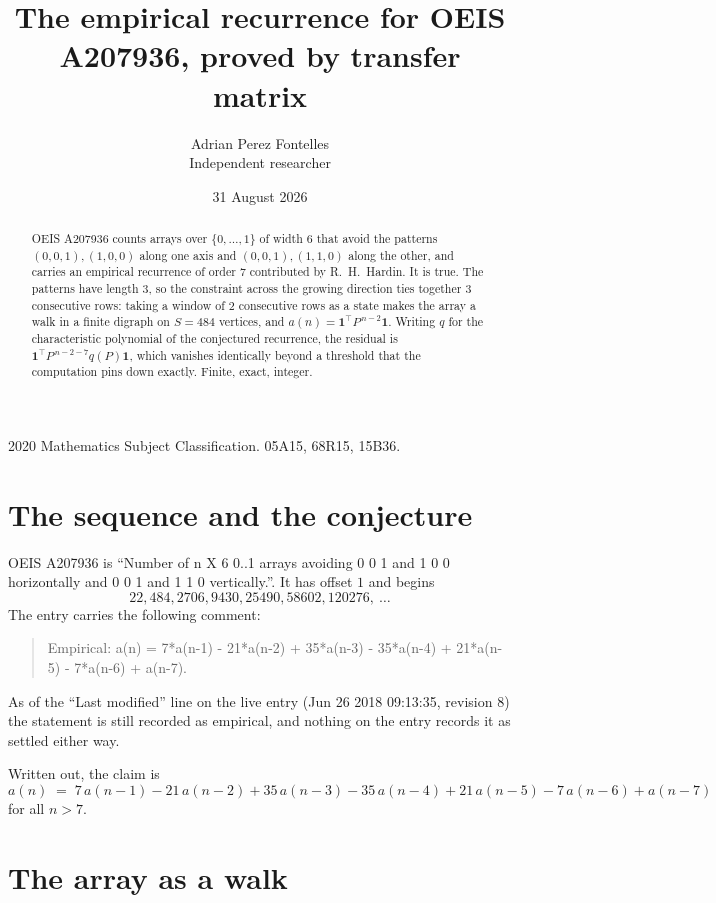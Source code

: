 \documentclass[11pt,a4paper]{article}
\title{The empirical recurrence for OEIS A207936, proved by transfer matrix}
\author{Adrian Perez Fontelles\\ \small Independent researcher}
\date{31 August 2026}
\theoremstyle{plain}
\theoremstyle{definition}
\begin{document}
\maketitle

\begin{abstract}
OEIS A207936 counts arrays over $\{0,\dots,1\}$ of width $6$ that avoid the patterns
$(0,0,1), (1,0,0)$ along one axis and $(0,0,1), (1,1,0)$ along the other, and carries an empirical recurrence of
order $7$ contributed by R.~H.~Hardin. It is true. The patterns have length $3$, so
the constraint across the growing direction ties together $3$ consecutive rows: taking a
window of $2$ consecutive rows as a state makes the array a walk in a finite digraph
on $S=484$ vertices, and $a(n)=\mathbf{1}^{\!\top}P^{\,n-2}\mathbf{1}$. Writing $q$
for the characteristic polynomial of the conjectured recurrence, the residual is
$\mathbf{1}^{\!\top}P^{\,n-2-7}q(P)\mathbf{1}$, which vanishes identically
beyond a threshold that the computation pins down exactly. Finite, exact, integer.
\end{abstract}

\noindent\small 2020 Mathematics Subject Classification. 05A15, 68R15, 15B36.\normalsize

\section{The sequence and the conjecture}

OEIS A207936 is ``Number of n X 6 0..1 arrays avoiding 0 0 1 and 1 0 0 horizontally and 0 0 1 and 1 1 0 vertically.''. It has offset
$1$ and begins
\[
22, 484, 2706, 9430, 25490, 58602, 120276,\ \dots
\]
The entry carries the following comment:
\begin{quote}\small
Empirical: a(n) = 7*a(n-1) - 21*a(n-2) + 35*a(n-3) - 35*a(n-4) + 21*a(n-5) - 7*a(n-6) + a(n-7).
\end{quote}
As of the ``Last modified'' line on the live entry (Jun 26 2018 09:13:35, revision
8) the statement is still recorded as empirical, and nothing on the entry
records it as settled either way.

Written out, the claim is
\begin{equation}\label{eq:conj}
a(n)\;=\;7\,a(n-1) - 21\,a(n-2) + 35\,a(n-3) - 35\,a(n-4) + 21\,a(n-5) - 7\,a(n-6) + a(n-7)
\end{equation}
for all $n>7$. 

\section{The array as a walk}
\end{document}
